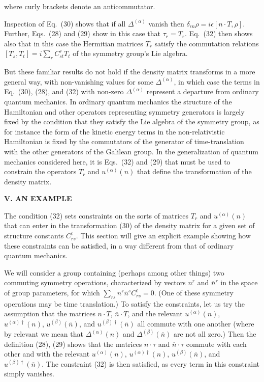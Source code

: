 where curly brackets denote an anticommutator.


Inspection of Eq.~(30) shows that if all $\Delta^{(\alpha)}$ vanish then $\delta_{\epsilon n}\rho=i\epsilon[n\cdot T, \rho]$.  Further, Eqs.~(28) and (29) show in this case that  $\tau_r=T_r$.   Eq.~(32) then shows also that in this case the Hermitian matrices $T_r$  satisfy the commutation relations $[T_s,T_t]=i\sum_r C^r_{st}T_t$ of the symmetry group's Lie algebra.  

But these familiar results do not hold if the density matrix transforms in a more general way, with non-vanishing values for some $\Delta^{(\alpha)}$, in which case the terms in Eq.~(30), (28), and (32) with non-zero $\Delta^{(\alpha)}$  represent a departure from ordinary quantum mechanics.  In ordinary quantum mechanics the structure of the Hamiltonian and other operators representing symmetry generators is largely fixed by the condition that they satisfy the Lie algebra of the symmetry group, as for instance the  form of the kinetic energy terms in the non-relativistic Hamiltonian is fixed by the commutators of the generator of time-translation with the other generators of the Galilean group.  In the generalization of quantum mechanics considered here, it is Eqs.~(32) and (29) that must be used to constrain the operators $T_r$ and  $u^{(\alpha)}(n)$ that define the transformation of the density matrix.   


\vspace{20pt}

\begin{center}
{\bf V. AN EXAMPLE}
\end{center}


The condition (32)  sets constraints on the sorts of matrices $T_r$ and $u^{(\alpha)}(n)$ that can enter in the transformation (30) of the density matrix for a given set of structure constants $C^t_{rs}$.  This section will  give an explicit example showing how these constraints can be satisfied, in a way different from that of ordinary quantum mechanics.  

We will consider a group containing (perhaps among other things) two commuting symmetry operations, characterized by vectors $n^r$ and $\overline{n}^r$ in the space of group parameters, for which $\sum_{rs}n^r\overline{n}^sC_{rs}^t=0$.  (One of these symmetry operations may be time translation.)  To satisfy the constraints, let us try the assumption that the matrices $n\cdot T$, $\overline{n}\cdot T$, and the relevant $u^{(\alpha)}(n)$, $u^{(\alpha)\dagger}(n)$, $u^{(\beta)}(\overline{n})$, and $u^{(\beta)\dagger}(\overline{n})$ all commute with one another (where by relevant we mean that $\Delta^{(\alpha)}(n)$ and $\Delta^{(\beta)}(\overline{n})$ are not all zero.)     Then the definition (28), (29) shows that the matrices $n\cdot \tau$ and $\overline{n}\cdot \tau$ commute with each other and with the relevant $u^{(\alpha)}(n)$, $u^{(\alpha)\dagger}(n)$, $u^{(\beta)}(\overline{n})$, and $u^{(\beta)\dagger}(\overline{n})$.    The constraint (32) is then satisfied, as every term in this constraint simply vanishes.

